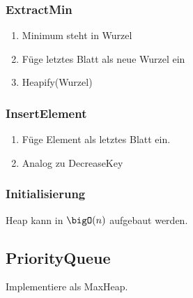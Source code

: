 \subsubsection*{ExtractMin}
\begin{enumerate}
	\item Minimum steht in Wurzel
	\item Füge letztes Blatt als neue Wurzel ein
	\item Heapify(Wurzel)
\end{enumerate}

\subsubsection*{InsertElement}
\begin{enumerate}
	\item Füge Element als letztes Blatt ein.
	\item Analog zu DecreaseKey
\end{enumerate}

\subsubsection*{Initialisierung}
Heap kann in $\bigO(n)$ aufgebaut werden.

\subsection*{PriorityQueue}
Implementiere als MaxHeap.
